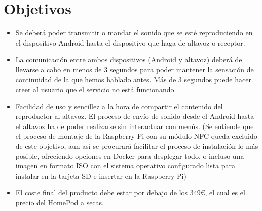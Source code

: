 \section{Objetivos}
\begin{itemize}
    \item Se deberá poder transmitir o mandar el sonido que se esté
    reproduciendo en el dispositivo Android hasta el dispositivo que haga de
    altavoz o receptor.
    \item La comunicación entre ambos dispositivos (Android y altavoz) deberá de
    llevarse a cabo en menos de 3 segundos para poder mantener la sensación de
    continuidad de la que hemos hablado antes. Más de 3 segundos puede hacer
    creer al usuario que el servicio no está funcionando.
    \item Facilidad de uso y sencillez a la hora de compartir el contenido del
    reproductor al altavoz. El proceso de envío de sonido desde el Android hasta
    el altavoz ha de poder realizarse sin interactuar con menús. (Se entiende
    que el proceso de montaje de la Raspberry Pi con su módulo NFC queda
    excluido de este objetivo, aun así se procurará facilitar el proceso de
    instalación lo más posible, ofreciendo opciones en Docker para desplegar
    todo, o incluso una imagen en formato ISO con el sistema operativo
    configurado lista para instalar en la tarjeta SD e insertar en la Raspberry
    Pi)
    \item El coste final del producto debe estar por debajo de los 349€, el cual
    es el precio del HomePod a secas.
\end{itemize}

